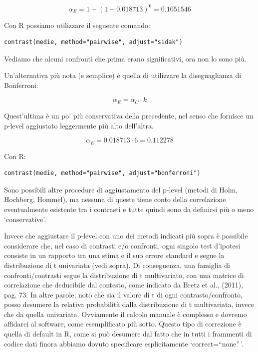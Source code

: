 \documentclass[a4paper,12pt,oneside]{book}
\theoremstyle{definition}
\theoremstyle{definition}
\theoremstyle{definition}
\theoremstyle{remark}
\begin{document}
\[ \alpha_E = 1 - (1 - 0.018713)^6 = 0.1051546 \]

Con R possiamo utilizzare il seguente comando:

\small

\begin{verbatim}
contrast(medie, method="pairwise", adjust="sidak")
\end{verbatim}

\normalsize

Vediamo che alcuni confronti che prima erano significativi, ora non lo
sono più.

Un'alternativa più nota (e semplice) è quella di utilizzare la
diseguaglianza di Bonferroni:

\[\alpha_E = \alpha_C \cdot k\]

Quest'ultima è un po' più conservativa della precedente, nel senso che
fornisce un p-level aggiustato leggermente più alto dell'altra.

\[\alpha_E = 0.018713 \cdot 6 = 0.112278 \]

Con R:

\small

\begin{verbatim}
contrast(medie, method="pairwise", adjust="bonferroni")
\end{verbatim}

\normalsize

Sono possibili altre procedure di aggiustamento del p-level (metodi di
Holm, Hochberg, Hommel), ma nessuna di queste tiene conto della
correlazione eventualmente esistente tra i contrasti e tutte quindi sono
da definirsi più o meno `conservative'.

Invece che aggiustare il p-level con uno dei metodi indicati più sopra è
possibile considerare che, nel caso di contrasti e/o confronti, ogni
singolo test d'ipotesi consiste in un rapporto tra una stima e il suo
errore standard e segue la distribuzione di t univariata (vedi sopra).
Di conseguenza, una famiglia di confronti/contrasti segue la
distribuzione di t multivariato, con una matrice di correlazione che
deducibile dal contesto, come indicato da Bretz et al., (2011), pag. 73.
In altre parole, noto che sia il valore di t di ogni
contrasto/confronto, posso desumere la relativa probabilità dalla
distribuzione di t multivariata, invece che da quella univariata.
Ovviamente il calcolo manuale è complesso e dovremo affidarci al
software, come esemplificato più sotto. Questo tipo di correzione è
quella di default in R, come si può desumere dal fatto che in tutti i
frammenti di codice dati finora abbiamo dovuto specificare
esplicitamente `correct=``none''\,'.
\end{document}
